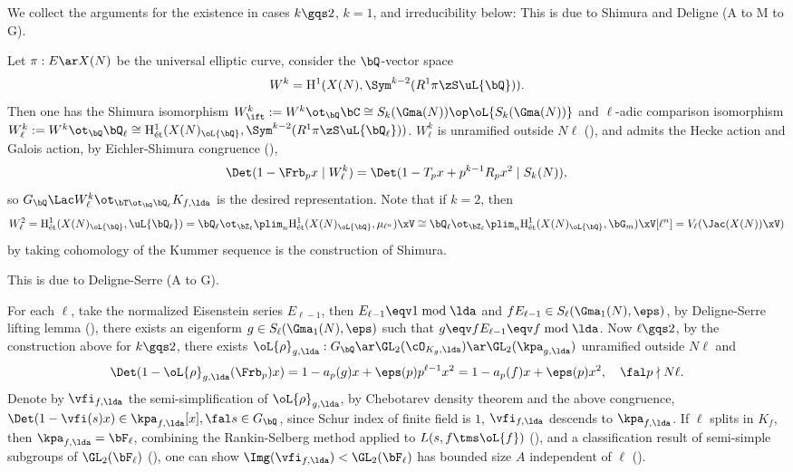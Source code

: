 \documentclass[article, a4paper, twoside]{universal}
\begin{document}
\begin{prf}
	We collect the arguments for the existence in cases $k\gqs2$, $k=1$, and irreducibility below:
	 This is due to Shimura\cite{Shimura1971AF} and Deligne\cite{Deligne1971Formes} (A to M to G).

	Let $\pi:E\ar X(N)$ be the universal elliptic curve, consider the $\bQ$-vector space
	\[
		W^{k}=\mathrm{H}_{}^{1}(X(N),\Sym^{k-2}(R^{1}\pi\zS\uL{\bQ})).
	\]
	Then one has the Shimura isomorphism $W^{k}_{\ift}:=W^{k}\ot_{\bQ}\bC\cong S_{k}(\Gma(N))\op\oL{S_{k}(\Gma(N))}$ and $\ell$-adic comparison isomorphism $W^{k}_{\ell}:=W^{k}\ot_{\bQ}\bQ_{\ell}\cong\mathrm{H}_{\text{{\'e}t}}^{1}(X(N)_{\oL{\bQ}},\Sym^{k-2}(R^{1}\pi\zS\uL{\bQ_{\ell}}))$. $W^{k}_{\ell}$ is unramified outside $N\ell$ (\cite[4.2]{Deligne1971Formes}), and admits the Hecke action and Galois action, by Eichler-Shimura congruence (\cite[4.9]{Deligne1971Formes}),
	\[
		\Det(1-\Frb_{p}x\mid W^{k}_{\ell})=\Det(1-T_{p}x+p^{k-1}R_{p}x^{2}\mid S_{k}(N)),
	\]
	so $G_{\bQ}\Lac W^{k}_{\ell}\ot_{\bT\ot_{\bQ}\bQ_{\ell}}K_{f,\lda}$ is the desired representation. Note that if $k=2$, then
	\[
		W_{\ell}^{2}=\mathrm{H}_{\text{{\'e}t}}^{1}(X(N)_{\oL{\bQ}},\uL{\bQ_{\ell}}) = \bQ_{\ell}\ot_{\bZ_{\ell}}\plim_{n}\mathrm{H}_{\text{{\'e}t}}^{1}(X(N)_{\oL{\bQ}},\mu_{\ell^{n}})\xV \cong \bQ_{\ell}\ot_{\bZ_{\ell}}\plim_{n}\mathrm{H}_{\text{{\'e}t}}^{1}(X(N)_{\oL{\bQ}},\bG_{m})\xV[\ell^{n}] = V_{\ell}(\Jac(X(N))\xV)
	\]
	by taking cohomology of the Kummer sequence is the construction of Shimura\cite[7.23]{Shimura1971AF}.

	 This is due to Deligne-Serre\cite{DS1974} (A to G).

	For each $\ell$, take the normalized Eisenstein series $E_{\ell-1}$, then $E_{\ell-1}\eqv1\bmod{\lda}$ and $fE_{\ell-1}\in S_{\ell}(\Gma_{1}(N),\eps)$, by Deligne-Serre lifting lemma (\cite[6.11]{DS1974}), there exists an eigenform $g\in S_{\ell}(\Gma_{1}(N),\eps)$ such that $g\eqv fE_{\ell-1}\eqv f\bmod{\lda}$. Now $\ell\gqs2$, by the construction above for $k\gqs2$, there exists $\oL{\rho}_{g,\lda}:G_{\bQ}\ar\GL_{2}(\cO_{K_{g},\lda})\ar\GL_{2}(\kpa_{g,\lda})$ unramified outside $N\ell$ and
	\[
		\Det(1-\oL{\rho}_{g,\lda}(\Frb_{p})x)=1-a_{p}(g)x+\eps(p)p^{\ell-1}x^{2}=1-a_{p}(f)x+\eps(p)x^{2},\quad \fal p\nmid N\ell.
	\]
	Denote by $\vfi_{f,\lda}$ the semi-simplification of $\oL{\rho}_{g,\lda}$, by Chebotarev density theorem and the above congruence, $\Det(1-\vfi(s)x)\in\kpa_{f,\lda}[x],\fal s\in G_{\bQ}$, since Schur index of finite field is $1$, $\vfi_{f,\lda}$ descends to $\kpa_{f,\lda}$. If $\ell$ splits in $K_{f}$, then $\kpa_{f,\lda}=\bF_{\ell}$, combining the Rankin-Selberg method applied to $L(s,f\tms\oL{f})$ (\cite[5.5, 8.3]{DS1974}), and a classification result of semi-simple subgroups of $\GL_{2}(\bF_{\ell})$ (\cite[7.2]{DS1974}), one can show $\Img(\vfi_{f,\lda})<\GL_{2}(\bF_{\ell})$ has bounded size $A$ independent of $\ell$ (\cite[8.4]{DS1974}).


\end{prf}
\end{document}
